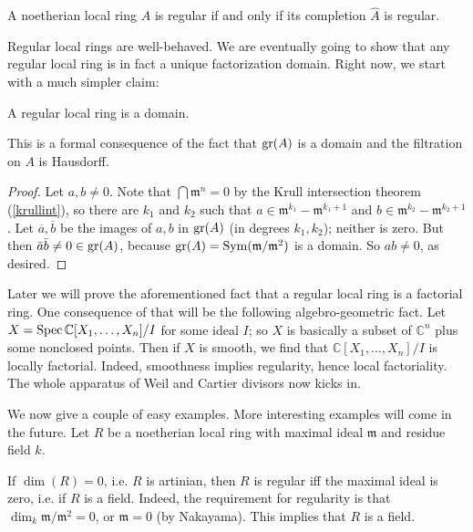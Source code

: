 \begin{proposition}
A noetherian local ring $A$ is regular if and only if its completion $\hat{A}$ is regular.
\end{proposition}

Regular local rings are well-behaved. We are eventually going to show that any
regular local ring is in fact a unique factorization domain. 
Right now, we start with a much simpler claim:

\begin{proposition} A regular local ring is a domain.
\label{reg loc means domain}
\label{regdomain}
\end{proposition}
This is a formal consequence of the fact that $\operatorname{gr}(A)$ is a domain and the
filtration on $A$ is Hausdorff.
\begin{proof} Let $a,b \neq 0$. Note that $\bigcap \mathfrak{m}^n=0$ by the
Krull intersection theorem (\cref{krullint}), so there are $k_1$ and $k_2$ such that 
$a \in \mathfrak{m}^{k_1} - \mathfrak{m}^{k_1 + 1}$ and $b \in
\mathfrak{m}^{k_2} - \mathfrak{m}^{k_2 + 1}$.
Let $\overline{a}, \overline{b}$ be the images of $a,b$ in $\operatorname{gr}(A)$ (in
degrees $k_1, k_2$); neither is
zero.
But then $\bar{a}\bar{b} \neq 0 \in \operatorname{gr}(A)$, because $\operatorname{gr}(A)=\mathrm{Sym}(\mathfrak{m}/\mathfrak{m}^2)$ is a domain. So $ab \neq 0$, as desired.
\end{proof}

Later we will prove the aforementioned fact that a regular local ring is a factorial
ring. One consequence of
that will be the following algebro-geometric fact. Let $X = \operatorname{Spec}
\mathbb{C}[X_1, \dots, X_n]/I$ for some ideal $I$; so $X$ is basically a subset
of $\mathbb{C}^n$ plus some nonclosed points. Then if $X$ is smooth, we find
that $\mathbb{C}[X_1, \dots, X_n]/I$ is locally factorial. Indeed, smoothness
implies regularity, hence local factoriality. The whole apparatus of Weil and
Cartier divisors now kicks in.



We now give a couple of easy examples. More interesting examples will come in
the future.
Let $R$ be a noetherian local ring with maximal ideal $\mathfrak{m}$ and
residue field $k$.

\begin{example} 
If $\dim(R)=0$, i.e. $R$ is artinian, then $R$ is regular iff the maximal ideal
is zero, i.e. if $R$ is a field.
Indeed, the requirement for regularity is that $\dim_k \mathfrak{m}/\mathfrak{m}^2 = 0$, or
$\mathfrak{m} = 0$ (by Nakayama). This implies that $R$ is a field.
\end{example} 

